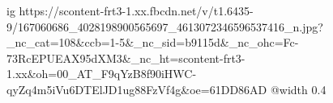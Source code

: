  
 
 
 
 

\ifcmt
  ig https://scontent-frt3-1.xx.fbcdn.net/v/t1.6435-9/167060686_4028198900565697_4613072346596537416_n.jpg?_nc_cat=108&ccb=1-5&_nc_sid=b9115d&_nc_ohc=Fc-73RcEPUEAX95dXM3&_nc_ht=scontent-frt3-1.xx&oh=00_AT_F9qYzB8f90iHWC-qyZq4m5iVu6DTElJD1ug88FzVf4g&oe=61DD86AD
  @width 0.4
\fi
